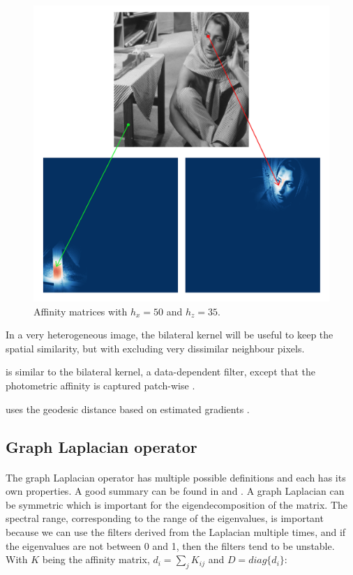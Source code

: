 \begin{description}[align=left]
  \begin{figure}[H]
      \centering
      \includegraphics[width=\textwidth]{img/bilateralAffinityPhoto35Spatial50.png}
      \caption{Affinity matrices with \(h_x = 50\) and \(h_z = 35\).}
  \end{figure}
  In a very heterogeneous image, the bilateral kernel will be useful to keep the spatial similarity, but with excluding very dissimilar neighbour pixels.

 \item [Non-Local Means (NLM)] is similar to the bilateral kernel, a data-dependent filter, except that the photometric affinity is captured patch-wise \cite{glide_2014} \cite{kervrann_nlm_2006}.
 \item [Locally Adaptive Regression Kernel (LARK)] uses the geodesic distance based on estimated gradients \cite{milanfar_symmetrizing_2013} \cite{takeda_kernel_2007}.
\end{description}

\subsection{Graph Laplacian operator}

\paragraph{}
The graph Laplacian operator has multiple possible definitions and each has its own properties.
A good summary can be found in \cite{siam_slides_2016} and \cite{chung_spectral_1997}.
A graph Laplacian can be symmetric which is important for the eigendecomposition of the matrix.
The spectral range, corresponding to the range of the eigenvalues, is important because we can use the filters derived from the Laplacian multiple times, and if the eigenvalues are not between 0 and 1, then the filters tend to be unstable.
With \(K\) being the affinity matrix, \(d_i = \sum_j K_{ij}\) and \(D = diag\{d_i\}\):

